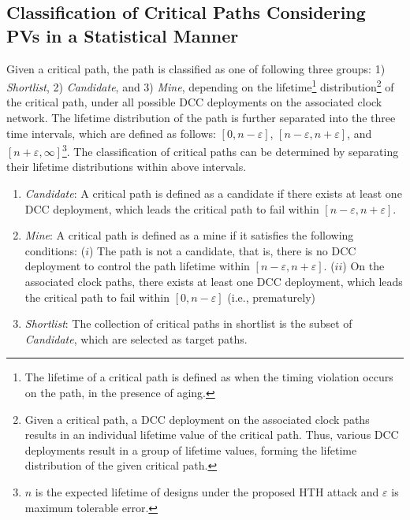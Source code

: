 
\subsection{Classification of Critical Paths Considering PVs in a Statistical Manner}
\label{sec:frame:cp}
Given a critical path, the path is classified as one of following three groups: 1) \textit{Shortlist}, 2) \textit{Candidate}, and 3) \textit{Mine}, depending on the lifetime\footnote{The lifetime of a critical path is defined as when the timing violation occurs on the path, in the presence of aging.} distribution\footnote{Given a critical path, a DCC deployment on the associated clock paths results in an individual lifetime value of the critical path. Thus, various DCC deployments result in a group of lifetime values, forming the lifetime distribution of the given critical path.} of the critical path, under all possible DCC deployments on the associated clock network. The lifetime distribution of the path is further separated into the three time intervals, which are defined as follows: $[0, n - \varepsilon]$, $[n - \varepsilon, n + \varepsilon]$, and $[n + \varepsilon, \infty]$\footnote{$n$ is the expected lifetime of designs under the proposed HTH attack and $\varepsilon$ is maximum tolerable error.}. The classification of critical paths can be determined by separating their lifetime distributions within above intervals. 
\begin{enumerate}[wide, labelwidth=!, labelindent=0pt]%
	\item \textit{Candidate}: A critical path is defined as a candidate if there exists at least one DCC deployment, which leads the critical path to fail within $[n - \varepsilon, n + \varepsilon]$.
	\item \textit{Mine}: A critical path is defined as a mine if it satisfies the following conditions: ($i$) The path is not a candidate, that is, there is no DCC deployment to control the path lifetime within $[n - \varepsilon, n + \varepsilon]$. ($ii$) On the associated clock paths, there exists at least one DCC deployment, which leads the critical path to fail within $[0, n - \varepsilon]$ (i.e., prematurely)%
	\item \textit{Shortlist}:  The collection of critical paths in shortlist is the subset of \textit{Candidate}, which are selected as target paths.
\end{enumerate}

